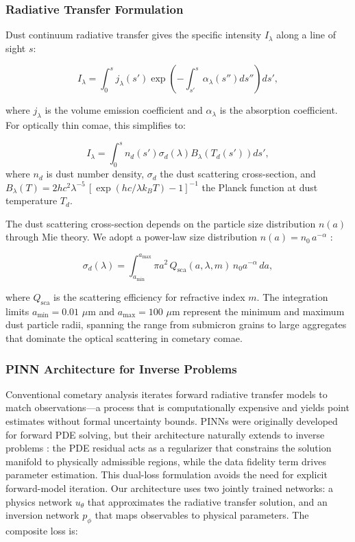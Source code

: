\documentclass[preprint2]{aastex631}
\begin{document}
\subsubsection{Radiative Transfer Formulation}

Dust continuum radiative transfer gives the specific intensity $I_\lambda$ along a line of sight $s$:

\begin{equation}\label{eq:rt_dust}
I_\lambda = \int_{0}^{s} j_\lambda(s') \exp\left(-\int_{s'}^{s} \alpha_\lambda(s'') ds''\right) ds',
\end{equation}

where $j_\lambda$ is the volume emission coefficient and $\alpha_\lambda$ is the absorption coefficient. For optically thin comae, this simplifies to:

\begin{equation}\label{eq:thin_dust}
I_\lambda = \int_{0}^{s} n_d(s') \sigma_d(\lambda) B_\lambda(T_d(s')) ds',
\end{equation}
where $n_d$ is dust number density, $\sigma_d$ the dust scattering cross-section, and $B_\lambda(T) = 2hc^2\lambda^{-5}\,[\exp(hc/\lambda k_B T) - 1]^{-1}$ the Planck function at dust temperature $T_d$.

The dust scattering cross-section depends on the particle size distribution $n(a)$ through Mie theory. We adopt a power-law size distribution $n(a) = n_0\, a^{-\alpha}$ \citep{kolokolova04}:

\begin{equation}\label{eq:mie_sigma}
\sigma_d(\lambda) = \int_{a_{\min}}^{a_{\max}} \pi a^2 \, Q_{\text{sca}}(a, \lambda, m) \, n_0 a^{-\alpha} \, da,
\end{equation}

where $Q_{\text{sca}}$ is the scattering efficiency for refractive index $m$. The integration limits $a_{\min} = 0.01$ $\mu$m and $a_{\max} = 100$ $\mu$m represent the minimum and maximum dust particle radii, spanning the range from submicron grains to large aggregates that dominate the optical scattering in cometary comae.

\subsubsection{PINN Architecture for Inverse Problems}

Conventional cometary analysis iterates forward radiative transfer models to match observations---a process that is computationally expensive and yields point estimates without formal uncertainty bounds. PINNs \citep{raissi19} were originally developed for forward PDE solving, but their architecture naturally extends to inverse problems \citep{lu21}: the PDE residual acts as a regularizer that constrains the solution manifold to physically admissible regions, while the data fidelity term drives parameter estimation. This dual-loss formulation avoids the need for explicit forward-model iteration. Our architecture uses two jointly trained networks: a physics network $u_\theta$ that approximates the radiative transfer solution, and an inversion network $p_\phi$ that maps observables to physical parameters. The composite loss is:
\end{document}
